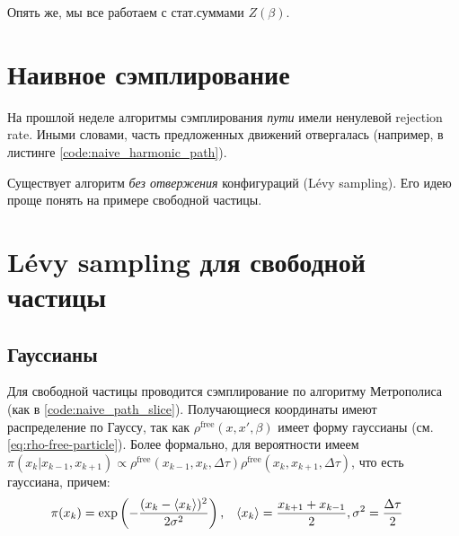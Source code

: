 \begin{lecture}
    Опять же, мы все работаем с стат.суммами $Z(\beta)$.

    \section{Наивное сэмплирование}
    На прошлой неделе алгоритмы сэмплирования \textit{пути} имели ненулевой rejection rate.
    Иными словами, часть предложенных движений отвергалась (например, в листинге \ref{code:naive_harmonic_path}).


    Существует алгоритм \textit{без отвержения} конфигураций (Lévy sampling).
    Его идею проще понять на примере свободной частицы.

    \section{Lévy sampling для свободной частицы}
    \subsection{Гауссианы}

    Для свободной частицы проводится сэмплирование по алгоритму Метрополиса (как в \ref{code:naive_path_slice}).
    Получающиеся координаты имеют распределение по Гауссу, так как $\rho^{\text{free}} (x, x', \beta)$ имеет форму гауссианы (см. \eqref{eq:rho-free-particle}).
    Более формально, для вероятности имеем $\pi (x_k | x_{k-1}, x_{k+1}) \propto \rho^{\text{free}} (x_{k-1}, x_k, \Delta \tau) \rho^{\text{free}} (x_k, x_{k+1}, \Delta \tau)$, что есть гауссиана, причем:
    \begin{align}
        \label{eq:pi-x_k-when-k-fixed}
        & \pi (x_k) = \exp\left(- \frac{(x_k - \braket{x_k})^2}{2\sigma^2}\right),
        & \braket{x_k} = \frac{x_{k+1} + x_{k-1}}{2}, \, 
        & \sigma^2 = \frac{\Delta \tau}{2} 
    \end{align}


\end{lecture}
